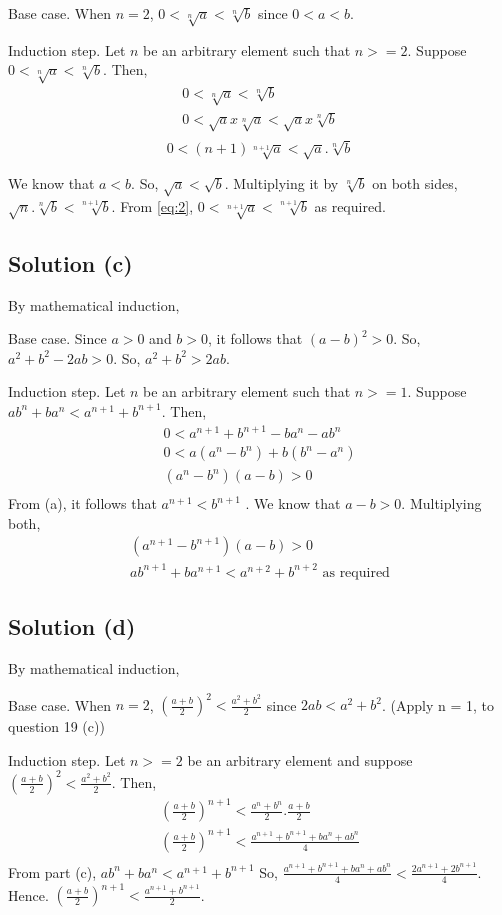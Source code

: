 \documentclass{article}
\begin{document}
Base case. When $n = 2$, $0 < \sqrt[n]{a} < \sqrt[n]{b}$ since $0 < a
< b$.

Induction step. Let $n$ be an arbitrary element such that $n >= 2$.
Suppose $0 < \sqrt[n]{a} < \sqrt[n]{b}$. Then,
\begin{align*}
  0 < \sqrt[n]{a} < \sqrt[n]{b} \\
  0 < \sqrt{a} x \sqrt[n]{a} < \sqrt{a} x \sqrt[n]{b} \\
\end{align*}
\begin{equation} \label{eq:2}
    0 < (n+1)\sqrt[n+1]{a} < \sqrt{a}.\sqrt[n]{b}
\end{equation}

We know that $a < b$. So, $\sqrt{a} < \sqrt{b}$. Multiplying it by
$\sqrt[n]{b}$ on both sides, $\sqrt{n}. \sqrt[n]{b} < \sqrt[n+1]{b}$.
From \ref{eq:2}, $0 < \sqrt[n+1]{a} < \sqrt[n+1]{b}$ as required.

\subsection{Solution (c)}
By mathematical induction,

Base case. Since $a > 0$ and $b>0$, it follows that $(a-b)^2 > 0$. So,
$a^2 + b^2 - 2ab > 0$. So, $a^2 + b^2 > 2ab$.

Induction step. Let $n$ be an arbitrary element such that $n >= 1$.
Suppose $ab^n + ba^n < a^{n+1} + b^{n+1}$. Then,
\begin{align*}
  0 < a^{n+1} + b^{n+1} - ba^n - ab^n \\
  0 < a(a^n - b^n) + b(b^n - a^n) \\
  (a^n - b^n)(a - b) > 0 \\
\end{align*}
From (a), it follows that $a^{n+1} < b^{n+1}$ . We know that $a - b >
0$. Multiplying both,
\begin{align*}
  (a^{n+1} - b^{n+1})(a-b) > 0 \\
  ab^{n+1} + ba^{n+1} < a^{n+2} + b^{n+2}  \text{  as required}
\end{align*}

\subsection{Solution (d)}
By mathematical induction,

Base case. When $n = 2$, $(\frac{a+b}{2})^2 < \frac{a^2 + b^2}{2}$ since
$2ab < a^2 + b^2$. (Apply n = 1, to question 19 (c))

Induction step. Let $n >= 2$ be an arbitrary element and suppose
$(\frac{a+b}{2})^2 < \frac{a^2 + b^2}{2}$. Then,
\begin{align*}
  (\frac{a+b}{2})^{n+1} < \frac{a^n + b^n}{2}.\frac{a+b}{2} \\
  (\frac{a+b}{2})^{n+1} < \frac{a^{n+1} + b^{n+1} + ba^n + ab^n}{4} \\
\end{align*}
From part (c), $ab^n + ba^n < a^{n+1} + b^{n+1}$
So, $\frac{a^{n+1} + b^{n+1} + ba^n + ab^n}{4} < \frac{2a^{n+1} +
  2b^{n+1}}{4}$. Hence. $(\frac{a+b}{2})^{n+1} < \frac{a^{n+1} + b^{n+1}}{2}$.
\end{document}
